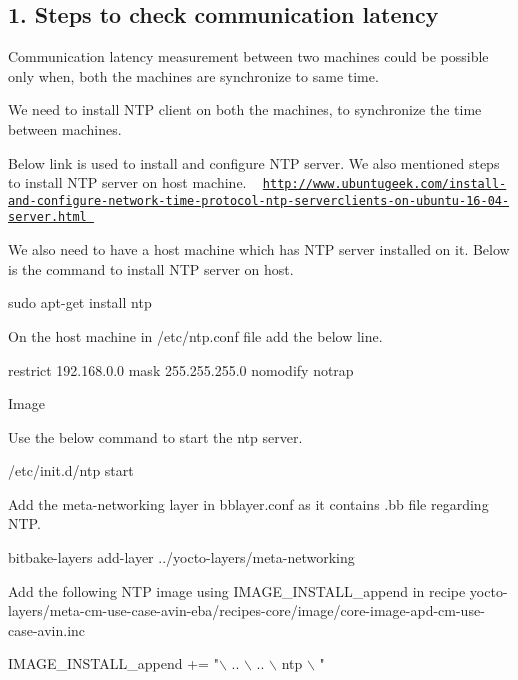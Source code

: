 \subsection*{1. Steps to check communication latency}


\begin{DoxyEnumerate}
\item Communication latency measurement between two machines could be possible only when, both the machines are synchronize to same time.
\item We need to install N\+TP client on both the machines, to synchronize the time between machines.
\item Below link is used to install and configure N\+TP server. We also mentioned steps to install N\+TP server on host machine. ~\newline
 \href{http://www.ubuntugeek.com/install-and-configure-network-time-protocol-ntp-serverclients-on-ubuntu-16-04-server.html}{\tt http\+://www.\+ubuntugeek.\+com/install-\/and-\/configure-\/network-\/time-\/protocol-\/ntp-\/serverclients-\/on-\/ubuntu-\/16-\/04-\/server.\+html }
\item We also need to have a host machine which has N\+TP server installed on it. Below is the command to install N\+TP server on host. 
\begin{DoxyCode}
sudo apt-get install ntp
\end{DoxyCode}

\item On the host machine in /etc/ntp.conf file add the below line. 
\begin{DoxyCode}
restrict 192.168.0.0 mask 255.255.255.0 nomodify notrap
\end{DoxyCode}

\item Image 
\item Use the below command to start the ntp server. 
\begin{DoxyCode}
/etc/init.d/ntp start
\end{DoxyCode}

\item Add the meta-\/networking layer in bblayer.\+conf as it contains .bb file regarding N\+TP. 
\begin{DoxyCode}
bitbake-layers add-layer ../yocto-layers/meta-networking
\end{DoxyCode}

\item Add the following N\+TP image using I\+M\+A\+G\+E\+\_\+\+I\+N\+S\+T\+A\+L\+L\+\_\+append in recipe yocto-\/layers/meta-\/cm-\/use-\/case-\/avin-\/eba/recipes-\/core/image/core-\/image-\/apd-\/cm-\/use-\/case-\/avin.\+inc 
\begin{DoxyCode}
IMAGE\_INSTALL\_append += "\(\backslash\)
        .. \(\backslash\)
        .. \(\backslash\)
        ntp \(\backslash\)
        "
\end{DoxyCode}


\end{DoxyEnumerate}

